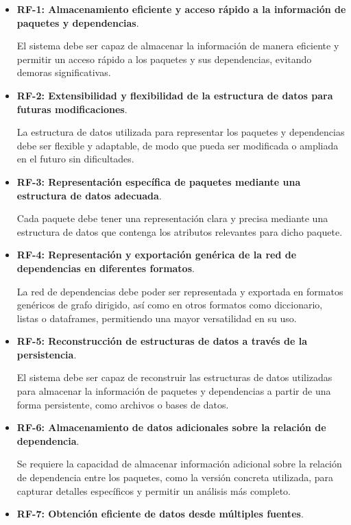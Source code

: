 \begin{itemize}
	\item \textbf{RF-1: Almacenamiento eficiente y acceso rápido a la información de paquetes y dependencias}.

	      El sistema debe ser capaz de almacenar la información de manera eficiente y permitir un acceso rápido a los paquetes y sus dependencias, evitando demoras significativas.

	\item \textbf{RF-2: Extensibilidad y flexibilidad de la estructura de datos para futuras modificaciones}.

	      La estructura de datos utilizada para representar los paquetes y dependencias debe ser flexible y adaptable, de modo que pueda ser modificada o ampliada en el futuro sin dificultades.

	\item \textbf{RF-3: Representación específica de paquetes mediante una estructura de datos adecuada}.

	      Cada paquete debe tener una representación clara y precisa mediante una estructura de datos que contenga los atributos relevantes para dicho paquete.

	\item \textbf{RF-4: Representación y exportación genérica de la red de dependencias en diferentes formatos}.

	      La red de dependencias debe poder ser representada y exportada en formatos genéricos de grafo dirigido, así como en otros formatos como diccionario, listas o dataframes, permitiendo una mayor versatilidad en su uso.

	\item \textbf{RF-5: Reconstrucción de estructuras de datos a través de la persistencia}.

	      El sistema debe ser capaz de reconstruir las estructuras de datos utilizadas para almacenar la información de paquetes y dependencias a partir de una forma persistente, como archivos o bases de datos.

	\item \textbf{RF-6: Almacenamiento de datos adicionales sobre la relación de dependencia}.

	      Se requiere la capacidad de almacenar información adicional sobre la relación de dependencia entre los paquetes, como la versión concreta utilizada, para capturar detalles específicos y permitir un análisis más completo.

	\item \textbf{RF-7: Obtención eficiente de datos desde múltiples fuentes}.


\end{itemize}
